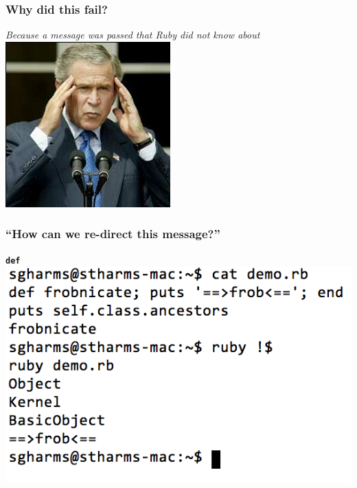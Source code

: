 \documentclass[slidestop,compress,mathserif]{beamer}
\begin{document}
\begin{frame}
	\frametitle{Why did this fail?}
	\pause
	\begin{center}
		\emph{Because a message was passed that Ruby did not know about}
		\vskip 0.75cm
		\pause
		\includegraphics[scale=0.80]{img/duh.jpg}		
	\end{center}
\end{frame}

\begin{frame}
	\frametitle{``How can we re-direct this message?''}
	\pause
	\begin{center}
		\texttt{\textbf{def}} \\
		\vskip 0.5cm
		\pause		
		\includegraphics[scale=0.45]{img/def_as_mp.png}		
	\end{center}
\end{frame}
\end{document}
